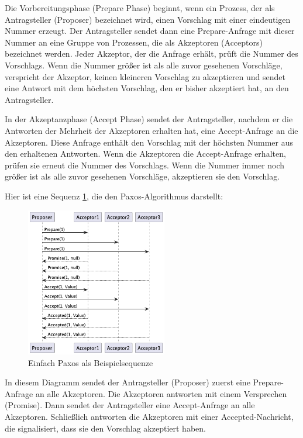 Die Vorbereitungsphase (Prepare Phase) beginnt, wenn ein Prozess, der als Antragsteller (Proposer) bezeichnet wird, einen Vorschlag mit einer eindeutigen Nummer erzeugt. Der Antragsteller sendet dann eine Prepare-Anfrage mit dieser Nummer an eine Gruppe von Prozessen, die als Akzeptoren (Acceptors) bezeichnet werden. Jeder Akzeptor, der die Anfrage erhält, prüft die Nummer des Vorschlags. Wenn die Nummer größer ist als alle zuvor gesehenen Vorschläge, verspricht der Akzeptor, keinen kleineren Vorschlag zu akzeptieren und sendet eine Antwort mit dem höchsten Vorschlag, den er bisher akzeptiert hat, an den Antragsteller.

In der Akzeptanzphase (Accept Phase) sendet der Antragsteller, nachdem er die Antworten der Mehrheit der Akzeptoren erhalten hat, eine Accept-Anfrage an die Akzeptoren. Diese Anfrage enthält den Vorschlag mit der höchsten Nummer aus den erhaltenen Antworten. Wenn die Akzeptoren die Accept-Anfrage erhalten, prüfen sie erneut die Nummer des Vorschlags. Wenn die Nummer immer noch größer ist als alle zuvor gesehenen Vorschläge, akzeptieren sie den Vorschlag.

Hier ist eine Sequenz \ref{fig:simple-paxos}, die den Paxos-Algorithmus darstellt:

\begin{figure}[htp!]
  \includegraphics[width=0.55\textwidth]{fig/uml/paxos-default}
  \caption{Einfach Paxos als Beispielsequenze}
  \label{fig:simple-paxos}
\end{figure}


In diesem Diagramm sendet der Antragsteller (Proposer) zuerst eine Prepare-Anfrage an alle Akzeptoren. Die Akzeptoren antworten mit einem Versprechen (Promise). Dann sendet der Antragsteller eine Accept-Anfrage an alle Akzeptoren. Schließlich antworten die Akzeptoren mit einer Accepted-Nachricht, die signalisiert, dass sie den Vorschlag akzeptiert haben.

